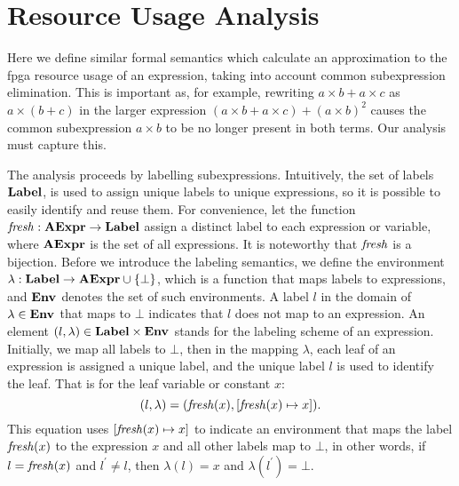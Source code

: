 \section{Resource Usage Analysis}
\label{so:sec:resource}

Here we define similar formal semantics which calculate an approximation to
the \gls{fpga} resource usage of an expression, taking into account common
subexpression elimination. This is important as, for example, rewriting $a
\times b + a \times c$ as $a \times (b + c)$ in the larger expression $(a
\times b + a \times c) + {(a \times b)}^2$ causes the common subexpression $a
\times b$ to be no longer present in both terms. Our analysis must capture
this.

The analysis proceeds by labelling subexpressions. Intuitively, the
set of labels $\mathbf{Label}$, is used to assign unique labels to unique
expressions, so it is possible to easily identify and reuse them. For
convenience, let the function $\operatorname{\mathit{fresh}}: \mathbf{AExpr}\to\mathbf{Label}$ assign a
distinct label to each expression or variable, where $\mathbf{AExpr}$ is the set
of all expressions.  It is noteworthy that $\operatorname{\mathit{fresh}}$ is a bijection. Before
we introduce the labeling semantics, we define the environment $\lambda:
\mathbf{Label}\to\mathbf{AExpr}\cup\{\bot\}$, which is a function that maps labels to
expressions, and $\mathbf{Env}_{}$ denotes the set of such environments. A label $l$ in
the domain of $\lambda\in\mathbf{Env}_{}$ that maps to $\bot$ indicates that $l$ does
not map to an expression. An element $(l, \lambda)\in\mathbf{Label}\times\mathbf{Env}_{}$
stands for the labeling scheme of an expression. Initially, we map all labels
to $\bot$, then in the mapping $\lambda$, each leaf of an expression is
assigned a unique label, and the unique label $l$ is used to identify the leaf.
That is for the leaf variable or constant $x$:
\begin{equation}
    (l, \lambda) = (\operatorname{\mathit{fresh}}(x), [\operatorname{\mathit{fresh}}(x)\mapsto{x}]).
\end{equation}
This equation uses $[\operatorname{\mathit{fresh}}(x)\mapsto{x}]$ to indicate an environment that
maps the label $\operatorname{\mathit{fresh}}(x)$ to the expression $x$ and all other labels map
to $\bot$, in other words, if $l = \operatorname{\mathit{fresh}}(x)$ and $l^\prime \neq l$, then
$\lambda(l) = x$ and $\lambda(l^\prime) = \bot$.

